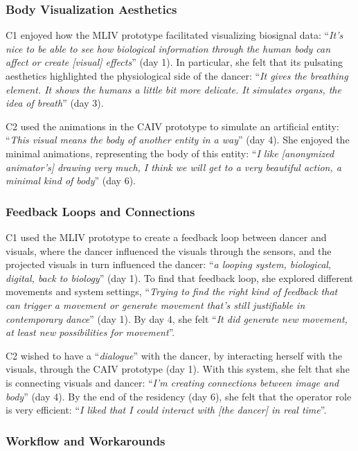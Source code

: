 \subsubsection{Body Visualization Aesthetics}

C1 enjoyed how the MLIV prototype facilitated visualizing biosignal data: “\textit{It's nice to be able to  see how biological information through the human body can affect or create [visual] effects}” (day 1). In particular, she felt that its pulsating aesthetics  highlighted the physiological side of the dancer: “\textit{It gives the breathing element. It shows the humans a little bit more delicate. It simulates organs, the idea of breath}” (day 3).

C2 used the animations in the CAIV prototype to simulate an artificial entity: “\textit{This visual means the body of another entity in a way}” (day 4). She enjoyed the minimal animations, representing the body of this entity: “\textit{I like [anonymized animator’s] drawing very much, I think we will get to a very beautiful action, a minimal kind of body}” (day 6).

\subsubsection{Feedback Loops and Connections}

C1 used the MLIV prototype to create a feedback loop between dancer and visuals, where the dancer influenced the visuals through the sensors, and the projected visuals in turn influenced the dancer: “\textit{a looping system, biological, digital, back to biology}” (day 1). To find that feedback loop, she explored different movements and system settings, “\textit{Trying to find the right kind of feedback that can trigger a movement or generate movement that's still justifiable in contemporary dance}” (day 1). By day 4, she felt “\textit{It did generate new movement, at least new possibilities for movement}”.

C2 wished to have a “\textit{dialogue}” with the dancer, by interacting herself with the visuals, through the CAIV prototype (day 1). With this system, she felt that she is connecting visuals and dancer: “\textit{I'm creating connections between image and body}” (day 4). By the end of the residency (day 6), she felt that the operator role is very efficient: “\textit{I liked that I could interact with [the dancer] in real time}”.

\subsubsection{Workflow and Workarounds}

